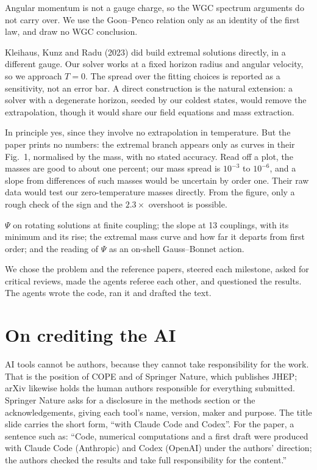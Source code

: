 \documentclass[12pt,a4paper]{article}
\begin{document}
\begin{description}[leftmargin=0pt,style=nextline]
\item[Why is $J$ not like a charge, for the weak gravity conjecture?]
Angular momentum is not a gauge charge, so the WGC spectrum arguments do not
carry over. We use the Goon--Penco relation only as an identity of the first law,
and draw no WGC conclusion.
\item[Why not solve directly at $T=0$?]
Kleihaus, Kunz and Radu (2023) did build extremal solutions directly, in a
different gauge. Our solver works at a fixed horizon radius and angular velocity,
so we approach $T=0$. The spread over the fitting choices is reported as a
sensitivity, not an error bar. A direct construction is the natural extension: a
solver with a degenerate horizon, seeded by our coldest states, would remove the
extrapolation, though it would share our field equations and mass extraction.
\item[Can't their extremal solutions remove the extrapolation caveat?]
In principle yes, since they involve no extrapolation in temperature. But the
paper prints no numbers: the extremal branch appears only as curves in their
Fig.~1, normalised by the mass, with no stated accuracy. Read off a plot, the
masses are good to about one percent; our mass spread is $10^{-3}$ to $10^{-6}$,
and a slope from differences of such masses would be uncertain by order one.
Their raw data would test our zero-temperature masses directly. From the figure,
only a rough check of the sign and the $2.3\times$ overshoot is possible.
\item[What exactly is new?]
$\Psi$ on rotating solutions at finite coupling; the slope at 13 couplings, with its
minimum and its rise; the extremal mass curve and how far it departs from first
order; and the reading of $\Psi$ as an on-shell Gauss--Bonnet action.
\item[Which parts did the humans do?]
We chose the problem and the reference papers, steered each milestone, asked for
critical reviews, made the agents referee each other, and questioned the results.
The agents wrote the code, ran it and drafted the text.
\end{description}

\section*{On crediting the AI}

AI tools cannot be authors, because they cannot take responsibility for the work.
That is the position of COPE and of Springer Nature, which publishes JHEP; arXiv
likewise holds the human authors responsible for everything submitted. Springer
Nature asks for a disclosure in the methods section or the acknowledgements, giving
each tool's name, version, maker and purpose. The
title slide carries the short form, ``with Claude Code and Codex''. For the paper, a sentence such as:
``Code, numerical computations and a first draft were produced with Claude Code
(Anthropic) and Codex (OpenAI) under the authors' direction; the authors checked
the results and take full responsibility for the content.''
\end{document}
